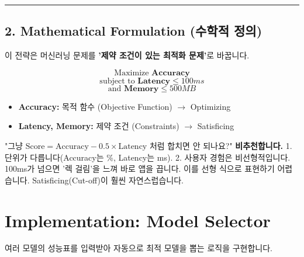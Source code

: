 \documentclass[11pt,a4paper]{book}
\theoremstyle{definition}
\begin{document}
\vspace{0.5cm}\hrule\vspace{0.5cm}

\subsection{2. Mathematical Formulation (수학적 정의)}
이 전략은 머신러닝 문제를 \textbf{'제약 조건이 있는 최적화 문제'}로 바꿉니다.

$$ \text{Maximize } \textbf{Accuracy} $$
$$ \text{subject to } \textbf{Latency} \le 100ms $$
$$ \text{and } \textbf{Memory} \le 500MB $$

\begin{itemize}
    \item \textbf{Accuracy:} 목적 함수 (Objective Function) $\rightarrow$ Optimizing
    \item \textbf{Latency, Memory:} 제약 조건 (Constraints) $\rightarrow$ Satisficing
\end{itemize}

\begin{warningbox}[title={가중치 합의 함정}]
"그냥 $\text{Score} = \text{Accuracy} - 0.5 \times \text{Latency}$ 처럼 합치면 안 되나요?"
\textbf{비추천합니다.}
1. 단위가 다릅니다(Accuracy는 \%, Latency는 ms).
2. 사용자 경험은 비선형적입니다. 100ms가 넘으면 '렉 걸림'을 느껴 바로 앱을 끕니다. 이를 선형 식으로 표현하기 어렵습니다. Satisficing(Cut-off)이 훨씬 자연스럽습니다.
\end{warningbox}

\section{Implementation: Model Selector}

여러 모델의 성능표를 입력받아 자동으로 최적 모델을 뽑는 로직을 구현합니다.
\end{document}
